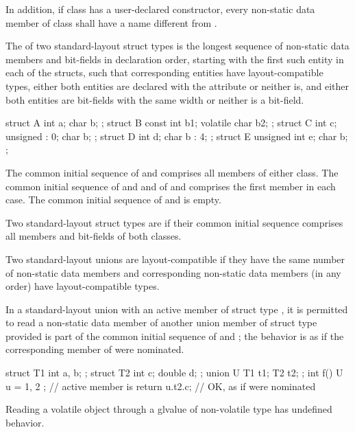\pnum
In addition, if class  has a user-declared
constructor, every non-static data member of class
 shall have a name different from .

\pnum
The  of two standard-layout struct
types is the longest sequence of non-static data
members and bit-fields in declaration order, starting with the first
such entity in each of the structs, such that corresponding entities
have layout-compatible types,
either both entities are declared with
the  attribute
or neither is,
and either both entities are bit-fields with the same width
or neither is a bit-field.
\begin{example}
\begin{codeblock}
struct A { int a; char b; };
struct B { const int b1; volatile char b2; };
struct C { int c; unsigned : 0; char b; };
struct D { int d; char b : 4; };
struct E { unsigned int e; char b; };
\end{codeblock}
The common initial sequence of  and  comprises all members
of either class. The common initial sequence of  and  and
of  and  comprises the first member in each case.
The common initial sequence of  and  is empty.
\end{example}

\pnum
Two standard-layout struct types are
 if
their common initial sequence comprises all members and bit-fields of
both classes.

\pnum
Two standard-layout unions are layout-compatible if they
have the same number of non-static data members and corresponding
non-static data members (in any order) have layout-compatible
types.

\pnum
In a standard-layout union with an active member
of struct type , it is permitted to read a non-static
data member  of another union member of struct type 
provided  is part of the common initial sequence of  and ;
the behavior is as if the corresponding member of  were nominated.
\begin{example}
\begin{codeblock}
struct T1 { int a, b; };
struct T2 { int c; double d; };
union U { T1 t1; T2 t2; };
int f() {
  U u = { { 1, 2 } };   // active member is 
  return u.t2.c;        // OK, as if  were nominated
}
\end{codeblock}
\end{example}
\begin{note}
Reading a volatile object through a glvalue of non-volatile type has
undefined behavior.
\end{note}

